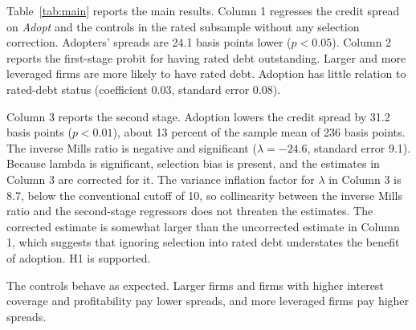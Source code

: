 \documentclass[11pt]{article}
\begin{document}
Table~\ref{tab:main} reports the main results. Column 1 regresses the credit spread on \textit{Adopt} and the controls in the rated subsample without any selection correction. Adopters' spreads are 24.1 basis points lower ($p<0.05$). Column 2 reports the first-stage probit for having rated debt outstanding. Larger and more leveraged firms are more likely to have rated debt. Adoption has little relation to rated-debt status (coefficient 0.03, standard error 0.08).

Column 3 reports the second stage. Adoption lowers the credit spread by 31.2 basis points ($p<0.01$), about 13 percent of the sample mean of 236 basis points. The inverse Mills ratio is negative and significant ($\lambda = -24.6$, standard error 9.1). Because lambda is significant, selection bias is present, and the estimates in Column 3 are corrected for it. The variance inflation factor for $\lambda$ in Column 3 is 8.7, below the conventional cutoff of 10, so collinearity between the inverse Mills ratio and the second-stage regressors does not threaten the estimates. The corrected estimate is somewhat larger than the uncorrected estimate in Column 1, which suggests that ignoring selection into rated debt understates the benefit of adoption. H1 is supported.

The controls behave as expected. Larger firms and firms with higher interest coverage and profitability pay lower spreads, and more leveraged firms pay higher spreads.
\end{document}

